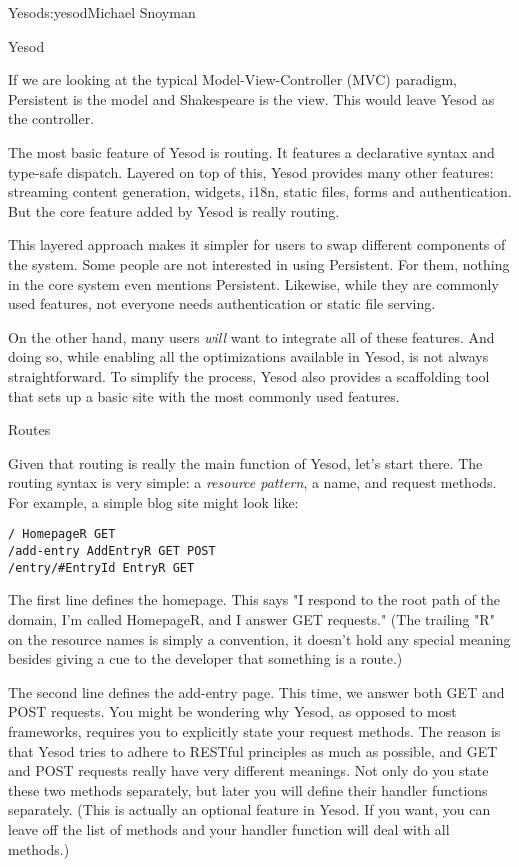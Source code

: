 \begin{aosachapter}{Yesod}{s:yesod}{Michael Snoyman}
\begin{aosasect1}{Yesod}

If we are looking at the typical Model-View-Controller (MVC)
paradigm, Persistent is the model and Shakespeare is the view. This
would leave Yesod as the controller.


The most basic feature of Yesod is routing. It features a declarative
syntax and type-safe dispatch. Layered on top of this, Yesod provides
many other features: streaming content generation, widgets, i18n,
static files, forms and authentication. But the core feature added by
Yesod is really routing.

This layered approach makes it simpler for users to swap different
components of the system. Some people are not interested in using
Persistent. For them, nothing in the core system even mentions
Persistent. Likewise, while they are commonly used features, not everyone needs
authentication or static file serving.

On the other hand, many users \emph{will} want to integrate all of
these features. And doing so, while enabling all the optimizations
available in Yesod, is not always straightforward. To simplify the
process, Yesod also provides a scaffolding tool that sets up a
basic site with the most commonly used features.

\begin{aosasect2}{Routes}

Given that routing is really the main function of Yesod, let's start
there. The routing syntax is very simple: a \emph{resource pattern}, a
name, and request methods. For example, a simple blog site might look
like:

\begin{verbatim}
/ HomepageR GET
/add-entry AddEntryR GET POST
/entry/#EntryId EntryR GET
\end{verbatim}

The first line defines the homepage. This says "I respond to the root
path of the domain, I'm called HomepageR, and I answer GET requests."
(The trailing "R" on the resource names is simply a convention, it
doesn't hold any special meaning besides giving a cue to the developer
that something is a route.)

The second line defines the add-entry page. This time, we answer both
GET and POST requests. You might be wondering why Yesod, as opposed to
most frameworks, requires you to explicitly state your request
methods. The reason is that Yesod tries to adhere to RESTful
principles as much as possible, and GET and POST requests really have
very different meanings. Not only do you state these two methods
separately, but later you will define their handler functions
separately. (This is actually an optional feature in Yesod. If you
want, you can leave off the list of methods and your handler function
will deal with all methods.)


\end{aosasect2}
\end{aosasect1}
\end{aosachapter}
